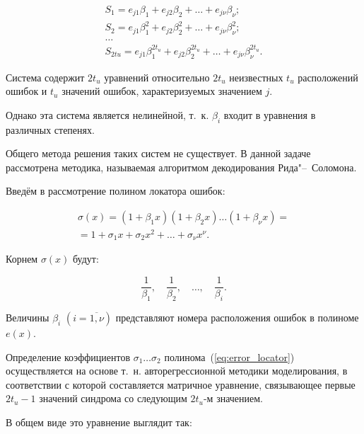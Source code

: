 \begin{equation}
  \label{eq:symptoms}
  \begin{gathered}
    S_1 = e_{j1}\beta_1 + e_{j2}\beta_2 + \ldots +
    e_{j\nu}\beta_{\nu};\\
    S_2 = e_{j1}\beta_1^2 + e_{j2}\beta_2^2 + \ldots +
    e_{j\nu}\beta_{\nu}^2;\\
    \ldots \\
    S_{2tu} = e_{j1}\beta_1^{2t_u} + e_{j2}\beta_2^{2t_u} + \ldots +
    e_{j\nu}\beta_{\nu}^{2t_u}.
  \end{gathered}
\end{equation}

Система содержит $2t_u$ уравнений относительно $2t_u$ неизвестных
$t_u$ расположений ошибок и $t_u$ значений ошибок, характеризуемых
значением $j$.

Однако эта система является нелинейной, т.~к. $\beta_i$ входит в
уравнения в различных степенях.

Общего метода решения таких систем не существует. В данной задаче
рассмотрена методика, называемая алгоритмом декодирования
Рида"--~Соломона.

Введём в рассмотрение полином локатора ошибок:

\begin{multline}
  \label{eq:error_locator}
  \sigma(x) = (1 + \beta_1x)(1 + \beta_2x) \ldots (1 + \beta_{\nu}x) =
  \\ = 1 + \sigma_1x + \sigma_2x^2 + \ldots + \sigma_{\nu}x^{\nu}.
\end{multline}

Корнем $\sigma(x)$  будут:

\begin{equation*}
  \frac{1}{\beta_1},\quad \frac{1}{\beta_2},\quad \ldots ,\quad \frac{1}{\beta_i}.
\end{equation*}

Величины $\beta_i$ $(i = \overline{1,\nu})$ представляют номера
расположения ошибок в полиноме $e(x)$.

Определение коэффициентов $\sigma_1 \ldots \sigma_2$
полинома~(\ref{eq:error_locator}) осуществляется на основе
т.~н. авторегрессионной методики моделирования, в соответствии с
которой составляется матричное уравнение, связывающее первые $2t_u-1$
значений синдрома со следующим $2t_u$-м значением.

В общем виде это уравнение выглядит так:


